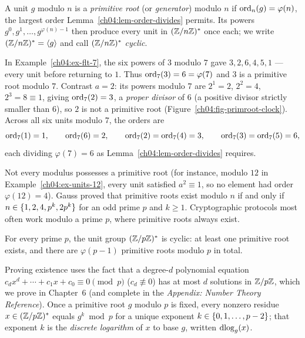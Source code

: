 \begin{definition}
\label{ch04:def-primroot}
A unit $g$ modulo $n$ is a \emph{primitive root} (or \emph{generator}) modulo $n$ if
$\operatorname{ord}_n(g) = \varphi(n)$, the largest order Lemma~\ref{ch04:lem-order-divides} permits. Its powers
$g^0, g^1, \dots, g^{\varphi(n)-1}$ then produce every unit in $(\mathbb{Z}/n\mathbb{Z})^{*}$ once each; we write
$(\mathbb{Z}/n\mathbb{Z})^{*} = \langle g \rangle$ and call $(\mathbb{Z}/n\mathbb{Z})^{*}$ \emph{cyclic}.
\end{definition}

\begin{example}
\label{ch04:ex-primroot-7}
In Example~\ref{ch04:ex-flt-7}, the six powers of $3$ modulo $7$ gave $3, 2, 6, 4, 5, 1$ --- every
unit before returning to $1$. Thus $\operatorname{ord}_7(3) = 6 = \varphi(7)$ and $3$ is a primitive root
modulo $7$. Contrast $a = 2$: its powers modulo $7$ are $2^1 = 2$, $2^2 = 4$, $2^3 = 8 \equiv 1$,
giving $\operatorname{ord}_7(2) = 3$, a \emph{proper divisor} of $6$ (a positive divisor strictly smaller than $6$),
so $2$ is not a primitive root (Figure~\ref{ch04:fig-primroot-clock}). Across all six units modulo
$7$, the orders are
\[
  \operatorname{ord}_7(1) = 1, \qquad \operatorname{ord}_7(6) = 2, \qquad \operatorname{ord}_7(2) = \operatorname{ord}_7(4) = 3, \qquad \operatorname{ord}_7(3) = \operatorname{ord}_7(5) = 6,
\]
each dividing $\varphi(7) = 6$ as Lemma~\ref{ch04:lem-order-divides} requires.
\end{example}

Not every modulus possesses a primitive root (for instance, modulo $12$ in
Example~\ref{ch04:ex-units-12}, every unit satisfied $a^2 \equiv 1$, so no element had order
$\varphi(12) = 4$). Gauss proved that primitive roots exist modulo $n$ if and only if
$n \in \{1, 2, 4, p^k, 2p^k\}$ for an odd prime $p$ and $k \ge 1$. Cryptographic protocols most
often work modulo a prime $p$, where primitive roots always exist.

\begin{theorem}
\label{ch04:thm-primroot-prime}
For every prime $p$, the unit group $(\mathbb{Z}/p\mathbb{Z})^{*}$ is cyclic: at least one primitive root exists, and
there are $\varphi(p-1)$ primitive roots modulo $p$ in total.
\end{theorem}

Proving existence uses the fact that a degree-$d$ polynomial equation
$c_d x^d + \cdots + c_1 x + c_0 \equiv 0 \pmod p$ ($c_d \not\equiv 0$) has at most $d$ solutions in
$\mathbb{Z}/p\mathbb{Z}$, which we prove in Chapter~6 (and complete in the \emph{Appendix: Number Theory
Reference}). Once a primitive root $g$ modulo $p$ is fixed, every nonzero residue $x \in (\mathbb{Z}/p\mathbb{Z})^{*}$
equals $g^k \bmod p$ for a unique exponent $k \in \{0, 1, \dots, p-2\}$; that exponent $k$ is the
\emph{discrete logarithm} of $x$ to base $g$, written $\operatorname{dlog}_g(x)$.

